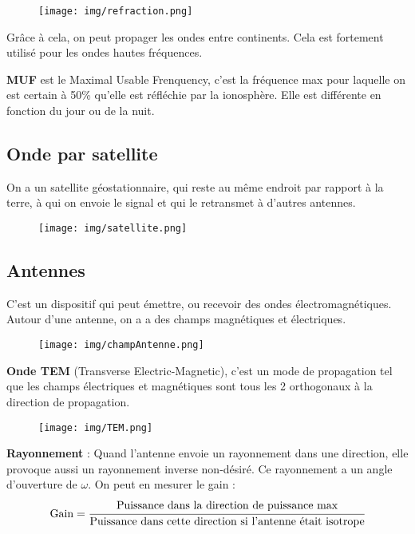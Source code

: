 		\begin{figure}[H]
			\centering
			\texttt{[image: img/refraction.png]}
		\end{figure}
		
		Grâce à cela, on peut propager les ondes entre continents. Cela est fortement utilisé pour les ondes hautes fréquences.
		
		\textbf{MUF} est le Maximal Usable Frenquency, c'est la fréquence max pour laquelle on est certain à 50\% qu'elle est réfléchie par la ionosphère. Elle est différente en fonction du jour ou de la nuit.
		
	\subsection{Onde par satellite}
		On a un satellite géostationnaire, qui reste au même endroit par rapport à la terre, à qui on envoie le signal et qui le retransmet à d'autres antennes.
		
		\begin{figure}[H]
			\centering
			\texttt{[image: img/satellite.png]}
		\end{figure}
		
	\subsection{Antennes}
		C'est un dispositif qui peut émettre, ou recevoir des ondes électromagnétiques. Autour d'une antenne, on a a des champs magnétiques et électriques.
	
		\begin{figure}[H]
			\centering
			\texttt{[image: img/champAntenne.png]}
		\end{figure}
		
		\textbf{Onde TEM} (Transverse Electric-Magnetic), c'est un mode de propagation tel que les champs électriques et magnétiques sont tous les 2 orthogonaux à la direction de propagation.
		\begin{figure}[H]
			\centering
			\texttt{[image: img/TEM.png]}
		\end{figure}
		
		\textbf{Rayonnement} : Quand l'antenne envoie un rayonnement dans une direction, elle provoque aussi un rayonnement inverse non-désiré. Ce rayonnement a un angle d'ouverture de $\omega$. On peut en mesurer le gain : 
		\begin{equation}
			\text{Gain} = \cfrac{\text{Puissance dans la direction de puissance max}}{\text{Puissance dans cette direction si l'antenne était isotrope}}
		\end{equation}
		
